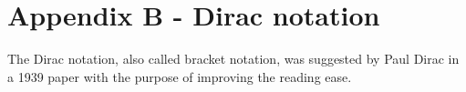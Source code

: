 \chapter{Appendix B - Dirac notation}
The Dirac notation, also called bracket notation, was suggested by Paul Dirac in a 1939 paper with the purpose of improving the reading ease. \cite{dirac_1939}